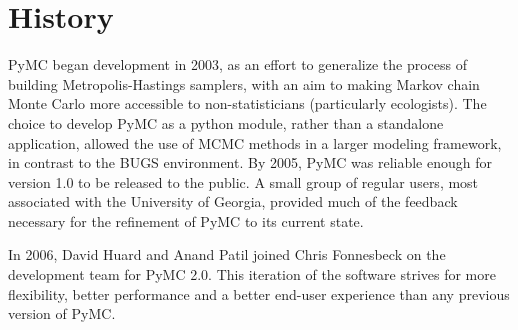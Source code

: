 \hypertarget{history}{}
\section*{History}

PyMC began development in 2003, as an effort to generalize the process of building Metropolis-Hastings samplers, with an aim to making Markov chain Monte Carlo more accessible to non-statisticians (particularly ecologists). The choice to develop PyMC as a python module, rather than a standalone application, allowed the use of MCMC methods in a larger modeling framework, in contrast to the BUGS environment. By 2005, PyMC was reliable enough for version 1.0 to be released to the public. A small group of regular users, most associated with the University of Georgia, provided much of the feedback necessary for the refinement of PyMC to its current state.

In 2006, David Huard and Anand Patil joined Chris Fonnesbeck on the development team for PyMC 2.0. This iteration of the software strives for more flexibility, better performance and a better end-user experience than any previous version of PyMC.



